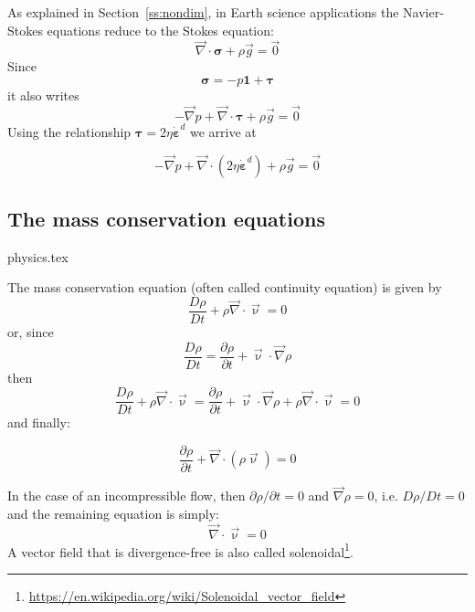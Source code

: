 As explained in Section~\ref{ss:nondim}, in Earth science applications the Navier-Stokes 
equations reduce to the Stokes equation:
\begin{equation}
{\vec \nabla}\cdot {\bm \sigma} + \rho {\vec g} = \vec{0}
\end{equation}
Since 
\begin{equation}
{\bm \sigma} = -p {\bm 1} + {\bm \tau}
\end{equation}
it also writes
\begin{equation}
-{\vec \nabla}p + {\vec \nabla}\cdot {\bm \tau} + \rho {\vec g} = \vec{0}
\end{equation}
Using the relationship ${\bm \tau} = 2 \eta \dot{\bm \varepsilon}^d$ we arrive at 
\begin{mdframed}[backgroundcolor=blue!5]
\begin{equation}
-{\vec \nabla}p + {\vec \nabla}\cdot (2 \eta \dot{\bm \varepsilon}^d ) + \rho {\vec g} = \vec{0}
\end{equation}
\end{mdframed}

\subsection{The mass conservation equations} 
\begin{flushright} {\tiny {\color{gray} physics.tex}} \end{flushright}

The mass conservation equation (often called continuity equation) is given by
\[
\frac{D\rho}{Dt} + \rho {\vec \nabla}\cdot{\vec \upnu} = 0
\]
or, since 
\[
\frac{D\rho}{Dt} = \frac{\partial \rho}{\partial t} + {\vec \upnu}\cdot {\vec \nabla}\rho
\]
then 
\[
\frac{D\rho}{Dt} + \rho {\vec \nabla}\cdot{\vec \upnu} = 
\frac{\partial \rho}{\partial t} + {\vec \upnu}\cdot {\vec \nabla}\rho
 + \rho {\vec \nabla}\cdot{\vec \upnu} = 0 
\]
and finally:
\begin{mdframed}[backgroundcolor=blue!5]
\begin{equation}
\frac{\partial \rho}{\partial t} + {\vec \nabla}\cdot(\rho {\vec \upnu}) = 0
\label{eq:massconvgen}
\end{equation}
\end{mdframed}
In the case of an incompressible flow, then $\partial \rho/\partial t=0$ and 
${\vec \nabla}\rho=0$, i.e. $D\rho/Dt=0$ and the remaining equation is simply:
\[
{\vec \nabla}\cdot{\vec \upnu} = 0
\]
A vector field that is divergence-free is also called 
solenoidal\footnote{\url{https://en.wikipedia.org/wiki/Solenoidal_vector_field}}.


